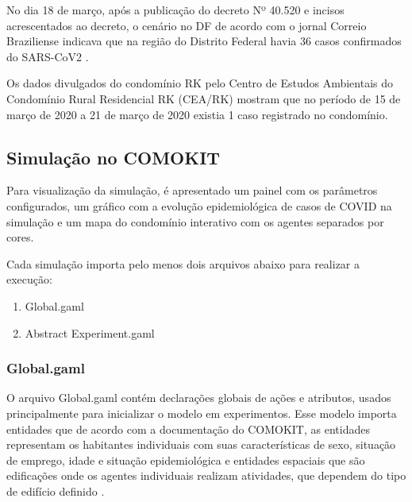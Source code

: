No dia 18 de março, após a publicação do decreto Nº 40.520 e incisos acrescentados ao decreto, o cenário no DF de acordo com o jornal Correio Braziliense indicava que na região do Distrito Federal havia 36 casos confirmados do SARS-CoV2 \cite{CorreioBraziliense032020:online}.

Os dados divulgados do condomínio RK pelo Centro de Estudos Ambientais do Condomínio Rural Residencial RK (CEA/RK) mostram que no período de 15 de março de 2020 a 21 de março de 2020 existia 1 caso registrado no condomínio.


\subsection{Simulação no COMOKIT}

Para visualização da simulação, é apresentado um painel com os parâmetros configurados, um gráfico com a evolução epidemiológica de casos de COVID na simulação e um mapa do condomínio interativo com os agentes separados por cores.


Cada simulação importa pelo menos dois arquivos abaixo para realizar a execução:
\begin{enumerate}
\item Global.gaml
\item Abstract Experiment.gaml
\end{enumerate}

\subsubsection{Global.gaml}

O arquivo Global.gaml contém declarações globais de ações e atributos, usados principalmente para inicializar o modelo em experimentos. Esse modelo importa entidades que de acordo com a documentação do COMOKIT, as entidades representam os habitantes individuais com suas características de sexo, situação de emprego, idade e situação epidemiológica e entidades espaciais que são edificações onde os agentes individuais realizam atividades, que dependem do tipo de edifício definido \cite{ComokitDoc}.


